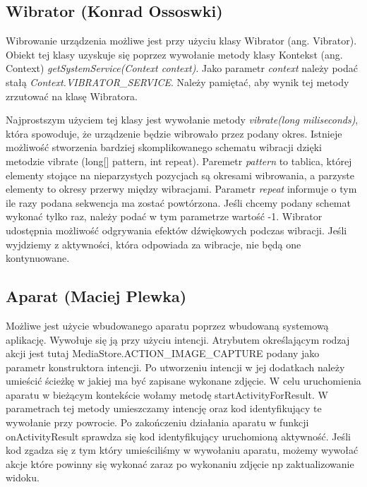 \subsection{Wibrator (Konrad Ossoswki)}
Wibrowanie urządzenia możliwe jest przy użyciu klasy Wibrator (ang. Vibrator). Obiekt tej klasy uzyskuje się poprzez wywołanie metody klasy Kontekst (ang. Context) \textit{getSystemService(Context context)}. Jako parametr \textit{context} należy podać stałą \textit{Context.VIBRATOR\_SERVICE}. Należy pamiętać, aby wynik tej metody zrzutować na klasę Wibratora.\par Najprostszym użyciem tej klasy jest wywołanie metody \textit{vibrate(long miliseconds)}, która spowoduje, że urządzenie będzie wibrowało przez podany okres. Istnieje możliwość stworzenia bardziej skomplikowanego schematu wibracji dzięki metodzie vibrate (long[] pattern, int repeat). Paremetr \textit{pattern} to tablica, której elementy stojące na nieparzystych pozycjach są okresami wibrowania, a parzyste elementy to okresy przerwy między wibracjami. Parametr \textit{repeat} informuje o tym ile razy podana sekwencja ma zostać powtórzona. Jeśli chcemy podany schemat wykonać tylko raz, należy podać w tym parametrze wartość -1. Wibrator udostępnia możliwość odgrywania efektów dźwiękowych podczas wibracji. Jeśli wyjdziemy z aktywności, która odpowiada za wibracje, nie będą one kontynuowane.\cite{vibrator}
\subsection{Aparat (Maciej Plewka)}

Możliwe jest użycie wbudowanego aparatu poprzez wbudowaną systemową aplikację. Wywołuje się ją przy użyciu intencji. Atrybutem określającym rodzaj akcji jest tutaj MediaStore.ACTION\_IMAGE\_CAPTURE podany jako parametr konstruktora intencji. Po utworzeniu intencji w jej dodatkach należy umieścić ścieżkę w jakiej ma być zapisane wykonane zdjęcie. W celu uruchomienia aparatu w bieżącym kontekście wołamy metodę startActivityForResult. W parametrach tej metody umieszczamy intencję oraz kod identyfikujący te wywołanie przy powrocie. Po zakończeniu działania aparatu w funkcji onActivityResult sprawdza się kod identyfikujący uruchomioną aktywność. Jeśli kod zgadza się z tym który umieściliśmy w wywołaniu aparatu, możemy wywołać akcje które powinny się wykonać zaraz po wykonaniu zdjęcie np zaktualizowanie widoku.
